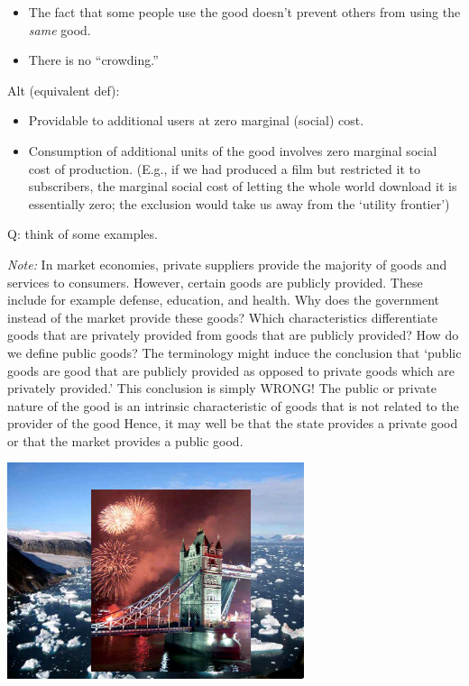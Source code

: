 \documentclass[]{article}
\begin{document}
\begin{itemize}
\item
  The fact that some people use the good doesn't prevent others from using the \emph{same} good.
\item
  There is no ``crowding.''
\end{itemize}

Alt (equivalent def):

\begin{itemize}
\item
  Providable to additional users at zero marginal (social) cost.
\item
  Consumption of additional units of the good involves zero marginal social cost of production. (E.g., if we had produced a film but restricted it to subscribers, the marginal social cost of letting the whole world download it is essentially zero; the exclusion would take us away from the `utility frontier')
\end{itemize}

Q: think of some examples.

\emph{Note:}
In market economies, private suppliers provide the majority of goods and services to consumers. However, certain goods are publicly provided. These include for example defense, education, and health. Why does the government instead of the market provide these goods? Which characteristics differentiate goods that are privately provided from goods that are publicly provided? How do we define public goods?
The terminology might induce the conclusion that `public goods are good that are publicly provided as opposed to private goods which are privately provided.' This conclusion is simply WRONG! The public or private nature of the good is an intrinsic characteristic of goods that is not related to the provider of the good
Hence, it may well be that the state provides a private good or that the market provides a public good.

\includegraphics[height=2.5in]{picsfigs/pubgoodspic.png}
\end{document}
